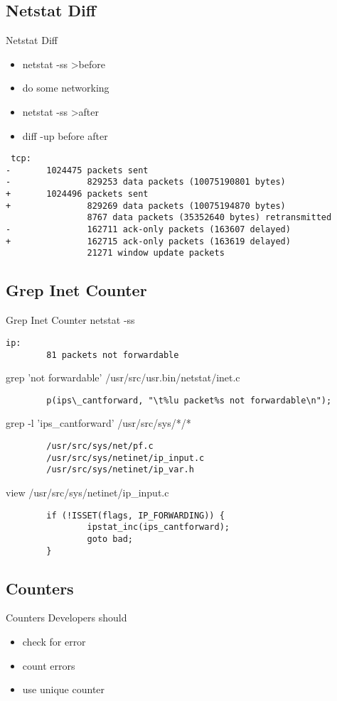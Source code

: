 \documentclass[14pt]{beamer}
\begin{document}
\subsection{Netstat Diff}
\begin{frame}[fragile]{Netstat Diff}
\begin{itemize}
  \item netstat -ss >before
  \item do some networking
  \item netstat -ss >after
  \item diff -up before after
\end{itemize}
\scriptsize
\begin{verbatim}
 tcp:
-       1024475 packets sent
-               829253 data packets (10075190801 bytes)
+       1024496 packets sent
+               829269 data packets (10075194870 bytes)
                8767 data packets (35352640 bytes) retransmitted
-               162711 ack-only packets (163607 delayed)
+               162715 ack-only packets (163619 delayed)
                21271 window update packets
\end{verbatim}
\end{frame}

\subsection{Grep Inet Counter}
\begin{frame}[fragile]{Grep Inet Counter}
\scriptsize
netstat -ss
\begin{verbatim}
ip:
        81 packets not forwardable
\end{verbatim}
grep 'not forwardable' /usr/src/usr.bin/netstat/inet.c
\begin{verbatim}
        p(ips\_cantforward, "\t%lu packet%s not forwardable\n");
\end{verbatim}
grep -l 'ips\_cantforward' /usr/src/sys/*/*
\begin{verbatim}
        /usr/src/sys/net/pf.c
        /usr/src/sys/netinet/ip_input.c
        /usr/src/sys/netinet/ip_var.h
\end{verbatim}
view /usr/src/sys/netinet/ip\_input.c
\begin{verbatim}
        if (!ISSET(flags, IP_FORWARDING)) {
                ipstat_inc(ips_cantforward);
                goto bad;
        }
\end{verbatim}
\end{frame}

\subsection{Counters}
\begin{frame}{Counters}
Developers should
\begin{itemize}
  \item check for error
  \item count errors
  \item use unique counter
\end{itemize}
\end{frame}
\end{document}
